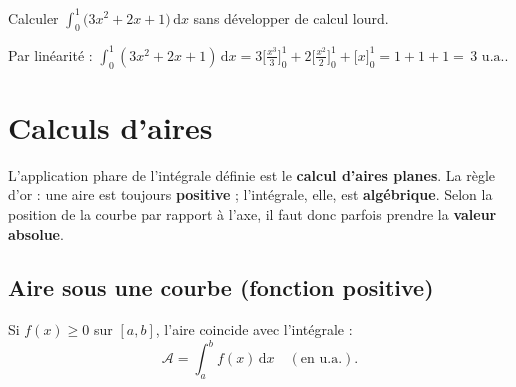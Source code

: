 \documentclass[11pt,a4paper]{article}
\newcommand{\dd}{\mathrm{d}}
\newcommand{\ua}{\,\text{u.a.}}   %
\begin{document}
\begin{exemple}
Calculer $\displaystyle\int_0^1\bigl(3x^2+2x+1\bigr)\,\dd x$ sans développer de calcul lourd.

\smallskip
Par linéarité :
$\int_0^1(3x^2+2x+1)\,\dd x=3\bigl[\tfrac{x^3}{3}\bigr]_0^1+2\bigl[\tfrac{x^2}{2}\bigr]_0^1+\bigl[x\bigr]_0^1
=1+1+1=\boxed{\,3\,}\ua.$
\end{exemple}

\section{Calculs d'aires}

L'application phare de l'intégrale définie est le \textbf{calcul d'aires planes}. La règle d'or :
une aire est toujours \textbf{positive} ; l'intégrale, elle, est \textbf{algébrique}. Selon la
position de la courbe par rapport à l'axe, il faut donc parfois prendre la \textbf{valeur absolue}.

\subsection{Aire sous une courbe (fonction positive)}

Si $f(x)\geqslant 0$ sur $[a,b]$, l'aire coincide avec l'intégrale :
\[
\boxed{\;\mathcal{A}=\int_a^b f(x)\,\dd x\quad(\text{en u.a.}).\;}
\]
\end{document}
